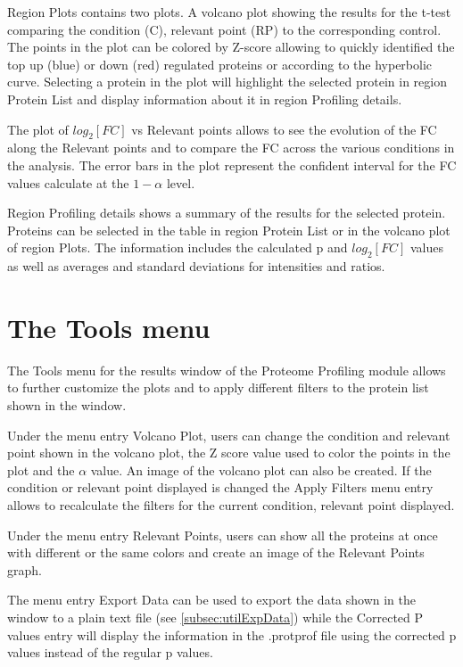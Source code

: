 Region Plots contains two plots. A volcano plot showing the results for the t-test
comparing the condition (C), relevant point (RP) to the corresponding control. The
points in the plot can be colored by Z-score allowing to quickly identified the top
up (blue) or down (red) regulated proteins or according to the hyperbolic curve.
Selecting a protein in the plot will highlight the selected protein in region Protein
List and display information about it in region Profiling details.

The plot of $log_2[FC]$ vs Relevant points allows to see the evolution of the FC
along the Relevant points and to compare the FC across the various conditions in
the analysis. The error bars in the plot represent the confident interval for the
FC values calculate at the $1-\alpha$ level.

Region Profiling details shows a summary of the results for the selected protein.
Proteins can be selected in the table in region Protein List or in the volcano plot
of region Plots. The information includes the calculated p and $log_2[FC]$ values
as well as averages and standard deviations for intensities and ratios.

\section{The Tools menu}
\label{sec:protprofTools}

The Tools menu for the results window of the Proteome Profiling module allows to further customize the plots and to apply different filters to the protein list shown in the window.

Under the menu entry Volcano Plot, users can change the condition and relevant point shown in the volcano plot, the Z score value used to color the points in the plot and the $\alpha$ value. An image of the volcano plot can also be created. If the condition or relevant point displayed is changed the Apply Filters menu entry allows to recalculate the filters for the current condition, relevant point displayed.

Under the menu entry Relevant Points, users can show all the proteins at once with different or the same colors and create an image of the Relevant Points graph.

The menu entry Export Data can be used to export the data shown in the window to a plain text file (see \autoref{subsec:utilExpData}) while the Corrected P values entry will display the information in the .protprof file using the corrected p values instead of the regular p values.

